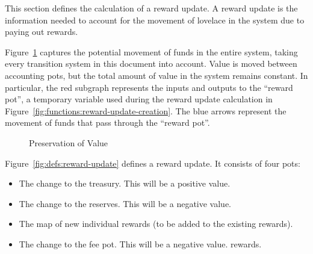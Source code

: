 This section defines the calculation of a reward update.
A reward update is the information needed to account for the movement of lovelace
in the system due to paying out rewards.

Figure~\ref{fig:fund-preservation} captures the potential movement of funds in the entire system,
taking every transition system in this document into account.  Value is moved between
accounting pots, but the total amount of value in the system remains constant.
In particular, the red subgraph represents the inputs and outputs to
the ``reward pot'', a temporary variable used during the reward update calculation in
Figure~\ref{fig:functions:reward-update-creation}.
The blue arrows represent the movement of funds that pass through the ``reward pot''.


\begin{figure}[htb]
  \begin{center}
  \end{center}
  \caption{Preservation of Value}
  \label{fig:fund-preservation}
\end{figure}

Figure~\ref{fig:defs:reward-update} defines a reward update.
It consists of four pots:
\begin{itemize}
  \item The change to the treasury. This will be a positive value.
  \item The change to the reserves. This will be a negative value.
  \item The map of new individual rewards (to be added to the existing rewards).
  \item The change to the fee pot. This will be a negative value.
    rewards.
\end{itemize}

